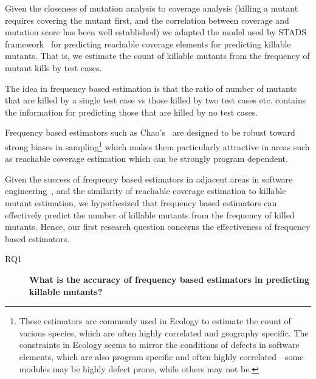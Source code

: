 \documentclass[sigconf,review,anonymous]{acmart}
\begin{document}
Given the closeness of mutation analysis
to coverage analysis (killing a mutant requires covering the mutant first, and
the correlation between coverage and mutation score has been well established)
we adapted the model used by STADS framework~\cite{bohme2018stads} for
predicting reachable coverage elements for predicting killable mutants.
That is, we estimate the count of killable mutants from the frequency of
mutant kills by test cases.
\begin{tcolorbox}[boxrule=0.5pt, arc=4pt, boxsep=0pt, width=\columnwidth]
The idea in frequency based estimation is that the ratio
of number of mutants that are killed by a single test case vs those killed by
two test cases etc. contains the information for predicting those that are
killed by no test cases.
\end{tcolorbox}



Frequency based estimators such as Chao's~\cite{chao2016species} are designed to
be robust toward strong biases in sampling\footnote{%
These estimators are commonly used in Ecology to estimate the count of various
species, which are often highly correlated and geography specific.
The constraints in Ecology seems to mirror the conditions of defects in software
elements, which are also program specific and often highly correlated---some
modules may be highly defect prone, while others may not be.} which makes them
particularly attractive in areas such as reachable coverage estimation
which can be strongly program dependent.

Given the success of frequency based estimators in adjacent areas in software
engineering~\cite{bohme2018assurances,accettura2015the}, and the similarity of
reachable coverage estimation to killable mutant estimation,
we hypothesized that frequency based estimators can effectively
predict the number of killable mutants from the frequency of killed mutants.
Hence, our first research question concerns the effectiveness of frequency based
estimators.

\begin{description}
  \item[RQ1] \textbf{What is the accuracy of frequency based estimators in predicting
    killable mutants?}
\end{description}
\end{document}
